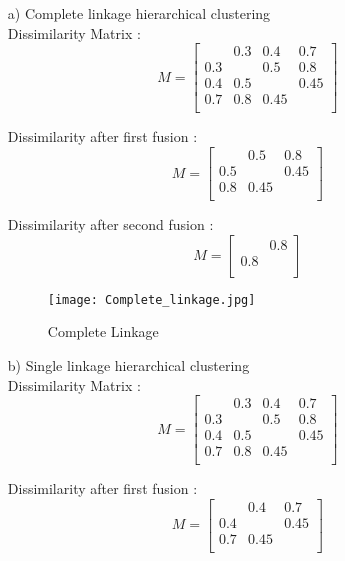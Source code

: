 \documentclass{article}
\begin{document}
\begin{enumerate}
  \item[a)] Complete linkage hierarchical clustering\\  
  Dissimilarity Matrix :
  \[
  M=
  \left[ {\begin{array}{cccc}
    & 0.3 & 0.4 & 0.7\\
   0.3 &  & 0.5 & 0.8\\
   0.4 & 0.5 &  & 0.45\\
   0.7 & 0.8 & 0.45 & \\
  \end{array} } \right]
\]

Dissimilarity after first fusion : 
 \[
  M=
  \left[ {\begin{array}{ccc}
    & 0.5 & 0.8 \\
   0.5 &  & 0.45 \\
   0.8 & 0.45 &  \\   
  \end{array} } \right]
\]

Dissimilarity after second fusion :
  \[
  M=
  \left[ {\begin{array}{cc}
    & 0.8  \\
   0.8 &   \\  
  \end{array} } \right]
\]
    \begin{figure}[H]
    \texttt{[image: Complete\_linkage.jpg]}
      \caption{Complete Linkage}
  	\end{figure}    
  \item[b)] Single linkage hierarchical clustering\\
  Dissimilarity Matrix :
  \[
  M=
  \left[ {\begin{array}{cccc}
    & 0.3 & 0.4 & 0.7\\
   0.3 &  & 0.5 & 0.8\\
   0.4 & 0.5 &  & 0.45\\
   0.7 & 0.8 & 0.45 & \\
  \end{array} } \right]
\]

Dissimilarity after first fusion : 
 \[
  M=
  \left[ {\begin{array}{ccc}
    & 0.4 & 0.7 \\
   0.4 &  & 0.45 \\
   0.7 & 0.45 &  \\   
  \end{array} } \right]
\]


\end{enumerate}
\end{document}
